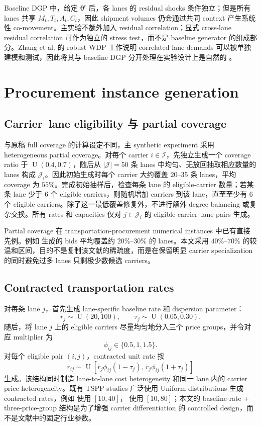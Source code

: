 \documentclass[11pt,a4paper]{ctexart}
\newcommand{\I}{\mathcal I}
\newcommand{\J}{\mathcal J}
\newcommand{\U}{\operatorname{U}}
\begin{document}
Baseline DGP 中，给定 $\boldsymbol\theta^t$ 后，各 lanes 的 residual shocks 条件独立；但是所有 lanes 共享 $M_t,T_t,A_t,C_t$，因此 shipment volumes 仍会通过共同 context 产生系统性 co-movement。主实验不额外加入 residual correlation；显式 cross-lane residual correlation 可作为独立的 stress test，而不是 baseline generator 的组成部分。Zhang et al. 的 robust WDP 工作说明 correlated lane demands 可以被单独建模和测试，因此将其与 baseline DGP 分开处理在实验设计上是自然的 \citep{zhang2015}。

\section{Procurement instance generation}

\subsection{Carrier--lane eligibility 与 partial coverage}

与原稿 full coverage 的计算设定不同，主 synthetic experiment 采用 heterogeneous partial coverage。对每个 carrier $i\in\I$，先独立生成一个 coverage ratio 于 $\U(0.4,0.7)$，随后从 $|\J|=50$ 条 lanes 中均匀、无放回抽取相应数量的 lanes 构成 $\J_i$。因此初始生成时每个 carrier 大约覆盖 $20$--$35$ 条 lanes，平均 coverage 为 $55\%$。完成初始抽样后，检查每条 lane 的 eligible-carrier 数量；若某条 lane 少于 $6$ 个 eligible carriers，则随机增加 carriers 到该 lane，直至至少有 $6$ 个 eligible carriers。除了这一最低覆盖修复外，不进行额外 degree balancing 或复杂交换。所有 rates 和 capacities 仅对 $j\in\J_i$ 的 eligible carrier--lane pairs 生成。

Partial coverage 在 transportation-procurement numerical instances 中已有直接先例。例如 \citet{remli2019} 生成的 bids 平均覆盖约 $20\%$--$30\%$ 的 lanes。本文采用 $40\%$--$70\%$ 的较温和区间，目的不是复制该文献的稀疏度，而是在保留明显 carrier specialization 的同时避免过多 lanes 只剩极少数候选 carriers。

\subsection{Contracted transportation rates}

对每条 lane $j$，首先生成 lane-specific baseline rate 和 dispersion parameter：
\[
\bar r_j\sim \U(20,100),\qquad \tau_j\sim \U(0.05,0.30).
\]
随后，将 lane $j$ 上的 eligible carriers 尽量均匀地分入三个 price groups，并令对应 multiplier 为
\[
\phi_{ij}\in\{0.5,1,1.5\}.
\]
对每个 eligible pair $(i,j)$，contracted unit rate 按
\[
r_{ij}\sim
\U\!\left[
\bar r_j\phi_{ij}(1-\tau_j),\,
\bar r_j\phi_{ij}(1+\tau_j)
\right]
\]
生成。该结构同时制造 lane-to-lane cost heterogeneity 和同一 lane 内的 carrier price heterogeneity。既有 TSPP studies 广泛使用 Uniform distributions 生成 contracted rates，例如 \citet{remli2019} 使用 $[10,40]$，\citet{li2023} 使用 $[10,80]$；本文的 baseline-rate + three-price-group 结构是为了增强 carrier differentiation 的 controlled design，而不是文献中的固定行业参数。
\end{document}
